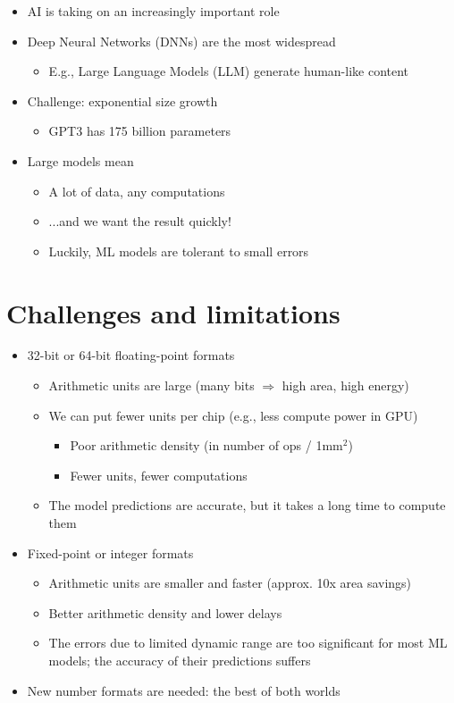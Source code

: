 \documentclass[12pt,openany, tikz,border=10pt]{book}
\begin{document}
\begin{itemize}
  \item[] AI is taking on an increasingly important role
  \item[] Deep Neural Networks (DNNs) are the most widespread
  \begin{itemize}
    \item[] E.g., Large Language Models (LLM) generate human-like content
  \end{itemize}
  \item[] Challenge: exponential size growth
  \begin{itemize}
    \item[] GPT3 has 175 billion parameters
  \end{itemize}
  \item[] Large models mean
  \begin{itemize}
    \item[] A lot of data, any computations
    \item[] ...and we want the result quickly!
    \item[] Luckily, ML models are tolerant to small errors
  \end{itemize}
\end{itemize}

\section{Challenges and limitations}
\begin{itemize}
    \item[] 32-bit or 64-bit floating-point formats
    \begin{itemize}
      \item[] Arithmetic units are large (many bits $\Rightarrow$ high area, high energy)
      \item[] We can put fewer units per chip (e.g., less compute power in GPU)
        \begin{itemize}
          \item[] Poor arithmetic density (in number of ops / 1mm$^2$)
          \item[] Fewer units, fewer computations
        \end{itemize}
      \item[] The model predictions are accurate, but it takes a long time to compute them
    \end{itemize}
    \item[] Fixed-point or integer formats
    \begin{itemize}
      \item[] Arithmetic units are smaller and faster (approx. 10x area savings)
      \item[] Better arithmetic density and lower delays
      \item[] The errors due to limited dynamic range are too significant for most ML models; the accuracy of their predictions suffers
    \end{itemize}
    \item[] New number formats are needed: the best of both worlds
  \end{itemize}
\end{document}
